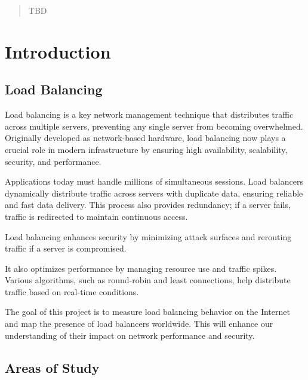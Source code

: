 \documentclass[12pt]{cwru_thesis}
\begin{document}
\printnomenclature

\begin{abstract}
  TBD
\end{abstract}

\mainmatter

\setcounter{secnumdepth}{2}

\chapter{Introduction} \label{chap:intro}
\section{Load Balancing} \label{sec:Loadsection}
Load balancing is a key network management technique that distributes traffic across multiple servers, preventing any single server from becoming overwhelmed. Originally developed as network-based hardware, load balancing now plays a crucial role in modern infrastructure by ensuring high availability, scalability, security, and performance.

Applications today must handle millions of simultaneous sessions. Load balancers dynamically distribute traffic across servers with duplicate data, ensuring reliable and fast data delivery. This process also provides redundancy; if a server fails, traffic is redirected to maintain continuous access.

Load balancing enhances security by minimizing attack surfaces and rerouting traffic if a server is compromised. 

It also optimizes performance by managing resource use and traffic spikes. Various algorithms, such as round-robin and least connections, help distribute traffic based on real-time conditions.


The goal of this project is to measure load balancing behavior on the Internet and map the presence of load balancers worldwide. This will enhance our understanding of their impact on network performance and security.


\section{Areas of Study} \label{sec:Areassection}
\end{document}
